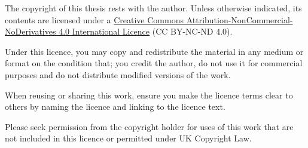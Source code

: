 
The copyright of this thesis rests with the author.
Unless otherwise indicated, its contents are licensed under a \href{https://creativecommons.org/licenses/by-nc-nd/4.0/}{Creative Commons Attribution-NonCommercial-NoDerivatives 4.0 International Licence} (CC BY-NC-ND 4.0).

Under this licence, you may copy and redistribute the material in any medium or format on the condition that;
you credit the author, do not use it for commercial purposes and do not distribute modified versions of the work.

When reusing or sharing this work, ensure you make the licence terms clear to others by naming the licence and linking to the licence text.

Please seek permission from the copyright holder for uses of this work that are not included in this licence or permitted under UK Copyright Law.
